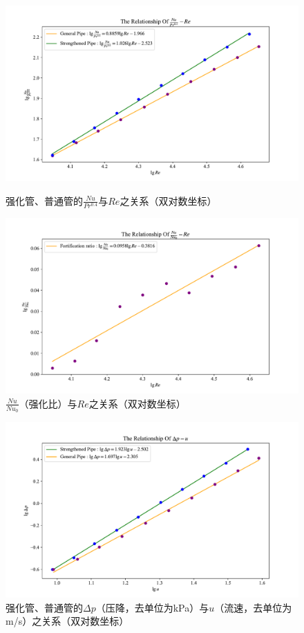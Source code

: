 \documentclass[UTF8,AutoFakeBold,a4paper]{article}
\begin{document}
\begin{figure}[h]
	\centering
	\includegraphics[scale=0.5]{强化普通}
	\caption{强化管、普通管的$\frac{Nu}{Pr^{0.4}}$与$Re$之关系（双对数坐标）}
	\label{fi3}
	\centering
	\includegraphics[scale=0.5]{强化比}
	\caption{$\frac{Nu}{Nu_{0}}$（强化比）与$Re$之关系（双对数坐标）}
	\label{fi3}
\end{figure}
\newpage

\begin{figure}[h]
	\centering
	\includegraphics[scale=0.5]{压降}
	\caption{强化管、普通管的$\Delta p $（压降，去单位为kPa）与$u$（流速，去单位为m/s）之关系（双对数坐标）}
	\label{fi3}
\end{figure}
\end{document}
